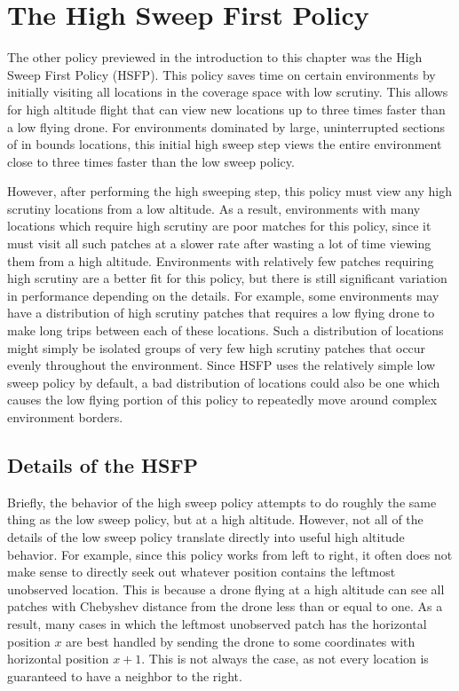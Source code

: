 \section{The High Sweep First Policy}

The other policy previewed in the introduction to this chapter was the High Sweep First Policy (HSFP). This policy saves time on certain environments by initially visiting all locations in the coverage space with low scrutiny. This allows for high altitude flight that can view new locations up to three times faster than a low flying drone. For environments dominated by large, uninterrupted sections of in bounds locations, this initial high sweep step views the entire environment close to three times faster than the low sweep policy.

However, after performing the high sweeping step, this policy must view any high scrutiny locations from a low altitude. As a result, environments with many locations which require high scrutiny are poor matches for this policy, since it must visit all such patches at a slower rate after wasting a lot of time viewing them from a high altitude. Environments with relatively few patches requiring high scrutiny are a better fit for this policy, but there is still significant variation in performance depending on the details. For example, some environments may have a distribution of high scrutiny patches that requires a low flying drone to make long trips between each of these locations. Such a distribution of locations might simply be isolated groups of very few high scrutiny patches that occur evenly throughout the environment. Since HSFP uses the relatively simple low sweep policy by default, a bad distribution of locations could also be one which causes the low flying portion of this policy to repeatedly move around complex environment borders.

\subsection{Details of the HSFP}

Briefly, the behavior of the high sweep policy attempts to do roughly the same thing as the low sweep policy, but at a high altitude. However, not all of the details of the low sweep policy translate directly into useful high altitude behavior. For example, since this policy works from left to right, it often does not make sense to directly seek out whatever position contains the leftmost unobserved location. This is because a drone flying at a high altitude can see all patches with Chebyshev distance from the drone less than or equal to one. As a result, many cases in which the leftmost unobserved patch has the horizontal position $x$ are best handled by sending the drone to some coordinates with horizontal position $x+1$. This is not always the case, as not every location is guaranteed to have a neighbor to the right.

